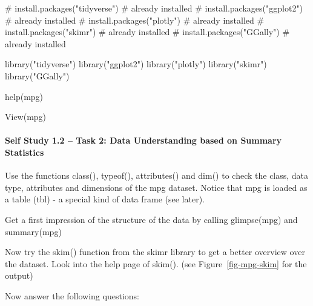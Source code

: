 \documentclass[
  letterpaper,
  DIV=11,
  numbers=noendperiod]{scrartcl}
\let\oldparagraph\paragraph
\renewcommand{\paragraph}[1]{\oldparagraph{#1}\mbox{}}
\newenvironment{Shaded}{\begin{snugshade}}{\end{snugshade}}
\newcommand{\CommentTok}[1]{\textcolor[rgb]{0.37,0.37,0.37}{#1}}
\newcommand{\FunctionTok}[1]{\textcolor[rgb]{0.28,0.35,0.67}{#1}}
\newcommand{\NormalTok}[1]{\textcolor[rgb]{0.00,0.23,0.31}{#1}}
\newcommand{\StringTok}[1]{\textcolor[rgb]{0.13,0.47,0.30}{#1}}
\begin{document}
\begin{Shaded}
\begin{Highlighting}[]
\CommentTok{\# install.packages("tidyverse") \# already installed}
\CommentTok{\# install.packages("ggplot2") \# already installed}
\CommentTok{\# install.packages("plotly") \# already installed}
\CommentTok{\# install.packages("skimr") \# already installed}
\CommentTok{\# install.packages("GGally") \# already installed}

\FunctionTok{library}\NormalTok{(}\StringTok{"tidyverse"}\NormalTok{)}
\FunctionTok{library}\NormalTok{(}\StringTok{"ggplot2"}\NormalTok{)}
\FunctionTok{library}\NormalTok{(}\StringTok{"plotly"}\NormalTok{)}
\FunctionTok{library}\NormalTok{(}\StringTok{"skimr"}\NormalTok{)}
\FunctionTok{library}\NormalTok{(}\StringTok{"GGally"}\NormalTok{)}

\FunctionTok{help}\NormalTok{(mpg)}

\FunctionTok{View}\NormalTok{(mpg)}
\end{Highlighting}
\end{Shaded}

\hypertarget{self-study-1.2-task-2-data-understanding-based-on-summary-statistics}{%
\paragraph{Self Study 1.2 -- Task 2: Data Understanding based on Summary
Statistics}\label{self-study-1.2-task-2-data-understanding-based-on-summary-statistics}}

Use the functions class(), typeof(), attributes() and dim() to check the
class, data type, attributes and dimensions of the mpg dataset. Notice
that mpg is loaded as a table (tbl) - a special kind of data frame (see
later).

Get a first impression of the structure of the data by calling
glimpse(mpg) and summary(mpg)

Now try the skim() function from the skimr library to get a better
overview over the dataset. Look into the help page of skim(). (see
Figure~\ref{fig-mpg-skim} for the output)

Now answer the following questions:
\end{document}
